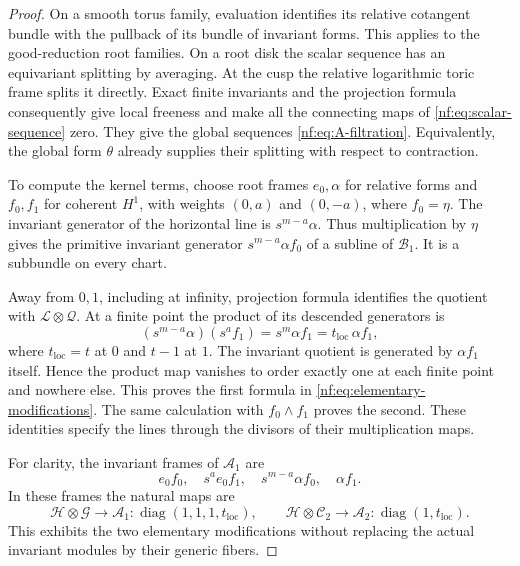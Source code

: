 \begin{proof}
On a smooth torus family, evaluation identifies its relative
cotangent bundle with the pullback of its bundle of invariant
forms. This applies to the good-reduction root families.
On a root disk the scalar sequence has an equivariant splitting
by averaging. At the cusp the relative logarithmic toric frame
splits it directly. Exact finite invariants and the projection
formula consequently give local freeness and make all the
connecting maps of \eqref{nf:eq:scalar-sequence} zero.
They give the global sequences \eqref{nf:eq:A-filtration}.
Equivalently, the global form $\theta$ already supplies their
splitting with respect to contraction.

To compute the kernel terms, choose root frames $e_0,\alpha$
for relative forms and $f_0,f_1$ for coherent $H^1$, with
weights $(0,a)$ and $(0,-a)$, where $f_0=\eta$.
The invariant generator of the horizontal line is
$s^{m-a}\alpha$. Thus multiplication by $\eta$ gives the
primitive invariant generator
$s^{m-a}\alpha f_0$ of a subline of $\mathcal B_1$.
It is a subbundle on every chart.

Away from $0,1$, including at infinity, projection formula
identifies the quotient with $\mathcal L\otimes\mathcal Q$.
At a finite point the product of its descended generators is
\begin{equation}\label{nf:eq:one-base-factor}
 (s^{m-a}\alpha)(s^af_1)=s^m\alpha f_1
             =t_{\mathrm{loc}}\,\alpha f_1,
\end{equation}
where $t_{\mathrm{loc}}=t$ at $0$ and $t-1$ at $1$.
The invariant quotient is generated by $\alpha f_1$ itself.
Hence the product map vanishes to order exactly one at each
finite point and nowhere else. This proves the first formula
in \eqref{nf:eq:elementary-modifications}. The same calculation
with $f_0\wedge f_1$ proves the second. These identities specify
the lines through the divisors of their multiplication maps.

For clarity, the invariant frames of $\mathcal A_1$ are
\[
 e_0f_0,\quad s^ae_0f_1,\quad
 s^{m-a}\alpha f_0,\quad\alpha f_1.
\]
In these frames the natural maps are
\begin{equation}\label{nf:eq:multiplication-matrices}
 \mathcal H\otimes\mathcal G\longrightarrow\mathcal A_1:
       \operatorname{diag}(1,1,1,t_{\mathrm{loc}}),
 \qquad
 \mathcal H\otimes\mathcal C_2\longrightarrow\mathcal A_2:
       \operatorname{diag}(1,t_{\mathrm{loc}}).
\end{equation}
This exhibits the two elementary modifications without
replacing the actual invariant modules by their generic fibers.


\end{proof}
